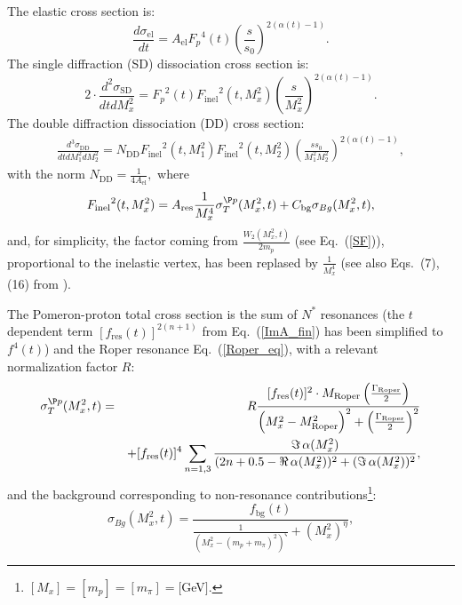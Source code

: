 \documentclass[12pt]{article}
\begin{document}
The elastic cross section is:
  \begin{equation}\label{elastic}\frac{d\sigma_\mathrm{el}}{dt}=A_\mathrm{el}{F_p}^4(t)\left(\frac{s}{s_0}\right)^{2(\alpha(t)-1)}.\end{equation}
The single diffraction (SD) dissociation cross section is:
  \begin{equation}\label{SD}2\cdot\frac{d^2\sigma_\mathrm{SD}}{dtdM_x^2}={F_p}^2(t){F_\mathrm{inel}}^2(t,M_x^2) \left(\frac{s}{M_x^2}\right)^{2(\alpha(t)-1)}.\end{equation}
The double diffraction dissociation (DD) cross section:
\begin{eqnarray}\label{DD}
   \frac{d^3\sigma_\mathrm{DD}}{dtdM_1^2dM_2^2}%
    =N_\mathrm{DD}{F_\mathrm{inel}}^2(t,M_1^2){F_\mathrm{inel}}^2(t,M_2^2)
   \left(\frac{ss_0}{M_1^2M_2^2}\right)^{2(\alpha(t)-1)}, %
\end{eqnarray}
with the norm $N_\mathrm{DD}=\frac{1}{4A_\mathrm{el}},$
where 
  \begin{equation}\label{eq:inelVertex}
   {F_\mathrm{inel}}^2(t,M_x^2)=A_\mathrm{res}\frac{1}{M_x^4}\sigma_T^{\P p}(M_x^2,t)+C_\mathrm{bg}\sigma_{Bg}(M_x^2,t),
  \end{equation}
and, for simplicity, the factor coming from $\frac{W_2(M_x^2,t)}{2m_p}$ (see Eq.~(\ref{SF})), proportional to the inelastic vertex, has been replased by $\frac{1}{M_x^4}$ (see also Eqs.~(7), (16) from \cite{PR}).  

The Pomeron-proton total cross section is the sum of $N^*$ resonances (the $t$ dependent term $[f_\mathrm{res}(t)]^{2(n+1)}$ from Eq.~(\ref{ImA_fin}) has been simplified to $f^4(t)$) and the Roper resonance Eq.~(\ref{Roper_eq}), with a relevant normalization factor $R$:
  \begin{eqnarray}
   \label{eq:sigma_tot}
    &\sigma_T^{\P p}(M_x^2,t)=&
    R\frac{[f_\mathrm{res}(t)]^{2} \cdot M_\mathrm{Roper}\left(\frac{\Gamma_\mathrm{Roper}}{2}\right)}
    {{\left(M_x^2-M_\mathrm{Roper}^2\right)}^2+{\left(\frac{\Gamma_\mathrm{Roper}}{2}\right)}^2}\\%
    &&+[f_\mathrm{res}(t)]^{4}\sum_{n=1,3} \frac{\Im\,\alpha(M^2_x)}{(2n+0.5-\Re\, \alpha(M_x^2))^2+(\Im\,\alpha(M^2_x))^2},\nonumber
  \end{eqnarray}
and the background corresponding to non-resonance contributions\footnote{$[M_x]=[m_p]=[m_{\pi}]=[$GeV$]$.}:
  \begin{equation}\label{eq:sigma_bg}
   \sigma_{Bg}(M_x^2,t)=\frac{f_\mathrm{bg}(t)}{\frac{1}{{\left(M_x^2-(m_p+m_{\pi})^2\right)}^\varsigma}+(M_x^2)^{\eta}},
  \end{equation}
  
\end{document}
